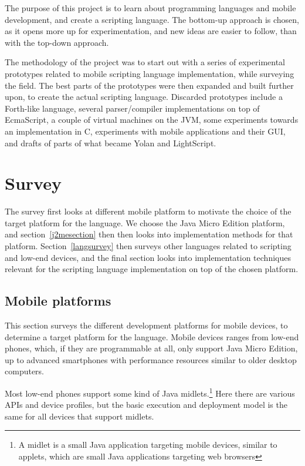 \documentclass[11pt]{report}
\begin{document}
The purpose of this project is to learn about programming languages and mobile development, and create a scripting language. 
The bottom-up approach is chosen, as it opens more up for experimentation, and new ideas are easier to follow, than with the top-down approach.

The methodology of the project was to start out with a series of experimental prototypes related to mobile scripting language implementation, while surveying the field. 
The best parts of the prototypes were then expanded and built further upon, to create the actual scripting language.
Discarded prototypes include a Forth-like language, several parser/compiler implementations on top of EcmaScript, a couple of virtual machines on the JVM, some experiments towards an implementation in C, experiments with mobile applications and their GUI, and drafts of parts of what became Yolan and LightScript.


\chapter{Survey}
\label{survey}
The survey first looks at different mobile platform to motivate the choice of the target platform for the language. 
We choose the Java Micro Edition platform, and section~\ref{j2mesection} then then looks into implementation methods for that platform.
Section~\ref{langsurvey} then surveys other languages related to scripting and low-end devices, and the final section looks into implementation techniques relevant for the scripting language implementation on top of the chosen platform.

\section{Mobile platforms}
This section surveys the different development platforms for mobile devices, to determine a target platform for the language.
Mobile devices ranges from low-end phones, which, if they are programmable at all, only support Java Micro Edition, up to advanced smartphones with performance resources similar to older desktop computers.

Most low-end phones support some kind of Java midlets.\footnote{A midlet is a small Java application targeting mobile devices, similar to applets, which are small Java applications targeting web browsers}
Here there are various APIs and device profiles, but the basic execution and deployment model is the same for all devices that support midlets.
\end{document}
